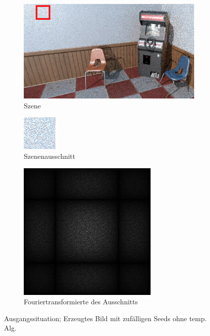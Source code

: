 \begin{figure}[H]
    \begin{subfigure}{\textwidth}
        \centering \includegraphics[width=0.7\linewidth]{content/TemporalerAlg/Bilder/WhiteNoise/white_noise_ausschnitt.png}
        \caption{Szene}
        \label{fig:Szene_Weißes Rauschen}
    \end{subfigure}
    \begin{subfigure}{0.5\textwidth}
        \centering \includegraphics[width=0.5\linewidth]{content/TemporalerAlg/Bilder/WhiteNoise/white_noise_64x64.jpg} 
        \caption{Szenenausschnitt}
        \label{fig:ausschnitt_Weißes_Rauschen}
    \end{subfigure}
    \begin{subfigure}{0.5\textwidth}
        \centering \includegraphics[width=0.5\linewidth]{content/TemporalerAlg/Bilder/WhiteNoise/white_noise_64x64_fourier.png}
        \caption{Fouriertransformierte des Ausschnitts}
        \label{fig:Fouriertransformierte_Weißes_Rauschen}
    \end{subfigure}
        \caption{Ausgangssituation; Erzeugtes Bild mit zufälligen Seeds ohne temp. Alg.}
        \label{fig:Path Tracer mit zufälligen Seeds}
\end{figure}


